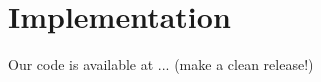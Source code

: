 \documentclass[10pt, conference, compsocconf]{IEEEtran}
\begin{document}
\section{Implementation}
Our code is available at ... (make a clean release!)


\end{document}
